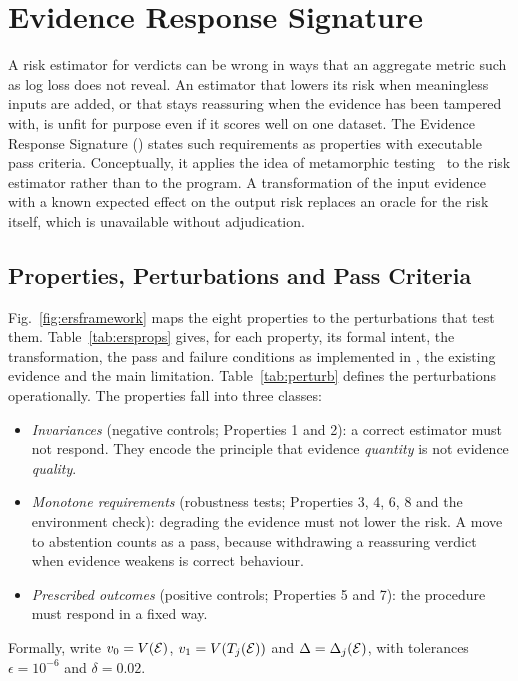 \section{Evidence Response Signature}\label{sec:ers}

A risk estimator for \NDO{} verdicts can be wrong in ways that an aggregate metric such as log loss does not reveal. An estimator that lowers its risk when meaningless inputs are added, or that stays reassuring when the evidence has been tampered with, is unfit for purpose even if it scores well on one dataset. The Evidence Response Signature (\ers{}) states such requirements as properties with executable pass criteria. Conceptually, it applies the idea of metamorphic testing~\cite{chen2018metamorphic,segura2016survey} to the risk estimator rather than to the program. A transformation of the input evidence with a known expected effect on the output risk replaces an oracle for the risk itself, which is unavailable without adjudication.

\subsection{Properties, Perturbations and Pass Criteria}
Fig.~\ref{fig:ersframework} maps the eight properties to the perturbations that test them. Table~\ref{tab:ersprops} gives, for each property, its formal intent, the transformation, the pass and failure conditions as implemented in , the existing evidence and the main limitation. Table~\ref{tab:perturb} defines the perturbations operationally. The properties fall into three classes:
\begin{itemize}
\item \emph{Invariances} (negative controls; Properties 1 and 2): a correct estimator must not respond. They encode the principle that evidence \emph{quantity} is not evidence \emph{quality}.
\item \emph{Monotone requirements} (robustness tests; Properties 3, 4, 6, 8 and the environment check): degrading the evidence must not lower the risk. A move to abstention counts as a pass, because withdrawing a reassuring verdict when evidence weakens is correct behaviour.
\item \emph{Prescribed outcomes} (positive controls; Properties 5 and 7): the procedure must respond in a fixed way.
\end{itemize}
Formally, write $v_0=V(\mathcal{E})$, $v_1=V(T_j(\mathcal{E}))$ and $\Delta=\Delta_j(\mathcal{E})$, with tolerances $\epsilon=10^{-6}$ and $\delta=0.02$.

